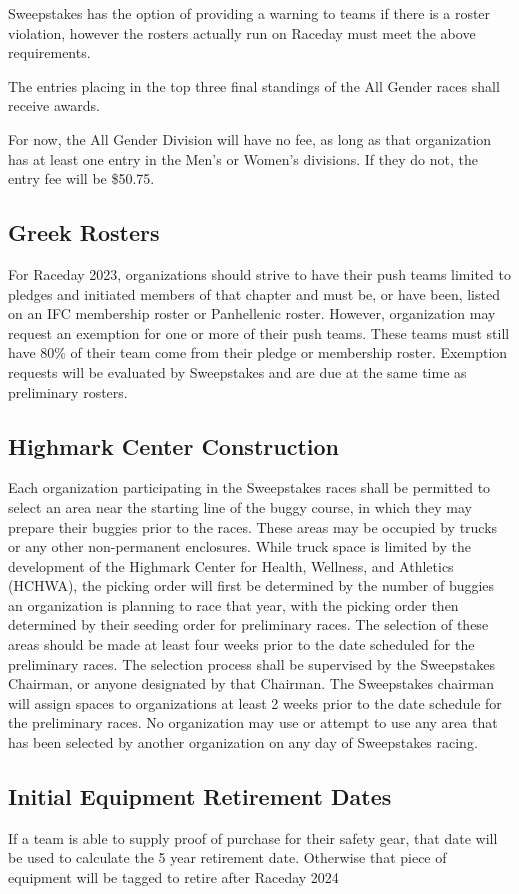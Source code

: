 Sweepstakes has the option of providing a warning to teams if there is a roster violation, however the rosters actually run on Raceday must meet the above requirements. 

The entries placing in the top three final standings of the All Gender races shall receive awards. 

For now, the All Gender Division will have no fee, as long as that organization has at least one entry in the Men's or Women's divisions. If they do not, the entry fee will be \$50.75. 

\subsection*{Greek Rosters} \label{Greek}
For Raceday 2023, organizations should strive to have their push teams limited to pledges and initiated members of that chapter and must be, or have been, listed on an IFC membership roster or Panhellenic roster. However, organization may request an exemption for one or more of their push teams. These teams must still have 80\% of their team come from their pledge or membership roster. Exemption requests will be evaluated by Sweepstakes and are due at the same time as preliminary rosters. 

\subsection*{Highmark Center Construction} \label{Seeding Area}
Each organization participating in the Sweepstakes races shall be permitted to select an area near the starting line of the buggy course, in which they may prepare their buggies prior to the races. These areas may be occupied by trucks or any other non-permanent enclosures. While truck space is limited by the development of the Highmark Center for Health, Wellness, and Athletics (HCHWA), the picking order will first be determined by the number of buggies an organization is planning to race that year, with the picking order then determined by their seeding order for preliminary races. The selection of these areas should be made at least four weeks prior to the date scheduled for the preliminary races. The selection process shall be supervised by the Sweepstakes Chairman, or anyone designated by that Chairman. The Sweepstakes chairman will assign spaces to organizations at least 2 weeks prior to the date schedule for the preliminary races. No organization may use or attempt to use any area that has been selected by another organization on any day of Sweepstakes racing.

\subsection*{Initial Equipment Retirement Dates}
If a team is able to supply proof of purchase for their safety gear, that date will be used to calculate the 5 year retirement date. Otherwise that piece of equipment will be tagged to retire after Raceday 2024
